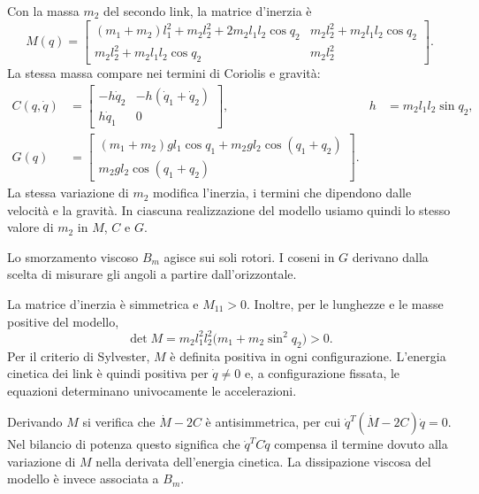 Con la massa $m_2$ del secondo link, la matrice d'inerzia è
\[
M(q)=\begin{bmatrix}
(m_1+m_2)l_1^2+m_2l_2^2+2m_2l_1l_2\cos q_2&m_2l_2^2+m_2l_1l_2\cos q_2\\
m_2l_2^2+m_2l_1l_2\cos q_2&m_2l_2^2
\end{bmatrix}.
\]
La stessa massa compare nei termini di Coriolis e gravità:
\begin{align*}
C(q,\dot q)&=\begin{bmatrix}-h\dot q_2&-h(\dot q_1+\dot q_2)\\h\dot q_1&0\end{bmatrix},
&h&=m_2l_1l_2\sin q_2,\\
G(q)&=\begin{bmatrix}(m_1+m_2)gl_1\cos q_1+m_2gl_2\cos(q_1+q_2)\\m_2gl_2\cos(q_1+q_2)\end{bmatrix}.
\end{align*}
La stessa variazione di $m_2$ modifica l'inerzia, i termini che
dipendono dalle velocità e la gravità. In ciascuna realizzazione
del modello usiamo quindi lo stesso valore di $m_2$ in $M$, $C$ e $G$.

Lo smorzamento viscoso $B_m$ agisce sui soli rotori. I coseni in $G$
derivano dalla scelta di misurare gli angoli a partire dall'orizzontale.

La matrice d'inerzia è simmetrica e $M_{11}>0$. Inoltre, per le lunghezze
e le masse positive del modello,
\[
\det M=m_2l_1^2l_2^2\bigl(m_1+m_2\sin^2q_2\bigr)>0.
\]
Per il criterio di Sylvester, $M$ è definita positiva in ogni
configurazione. L'energia cinetica dei link è quindi positiva per
$\dot q\ne 0$ e, a configurazione fissata, le equazioni determinano
univocamente le accelerazioni.

Derivando $M$ si verifica che $\dot M-2C$ è antisimmetrica, per cui
$\dot q^T(\dot M-2C)\dot q=0$. Nel bilancio di potenza questo significa
che $\dot q^TC\dot q$ compensa il termine dovuto alla variazione di $M$
nella derivata dell'energia cinetica. La dissipazione viscosa del
modello è invece associata a $B_m$.

